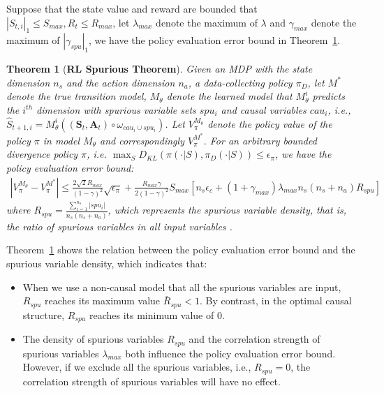 \documentclass{article}
\theoremstyle{plain}
\newtheorem{theorem}{Theorem}[section]
\theoremstyle{definition}
\theoremstyle{remark}
\begin{document}
Suppose that the state value and reward are bounded that $|S_{t,i}|_1\leq S_{max}, R_t\leq R_{max}$, let $\lambda_{max}$ denote the maximum of $\lambda$ and $\gamma_{max}$ denote the maximum of $|\gamma_{spu}|_1$, we have the policy evaluation error bound in Theorem~\ref{theorem-spurious-rl}.
\begin{theorem}[\textbf{RL Spurious Theorem}]
Given an MDP with the state dimension $n_s$ and the action dimension $n_a$, 
a data-collecting policy $\pi_D$,
let $M^*$ denote the true transition model, 
$M_\theta$ denote the learned model that $M_\theta^i$ predicts the $i^{th}$ dimension with spurious variable sets $spu_i$ and causal variables $cau_i$, i.e.,  $\hat{S}_{t+1,i}=M^i_{\theta}((\textbf{S}_t,\textbf{A}_t)\circ \omega_{cau_i\cup spu_i})$.
Let $V_{\pi}^{M_\theta}$ denote the policy value of the policy $\pi$ in model $M_{\theta}$ and correspondingly $V_{\pi}^{M^*}$.
For an arbitrary bounded divergence policy $\pi$, i.e. $\max_{S} D_{KL}(\pi(\cdot|S),\pi_{D}(\cdot|S))\leq \epsilon_{\pi}$, we have the policy evaluation error bound:
\begin{align}
|V_{\pi}^{M_\theta}-V_{\pi}^{M^*}|\leq 
\frac{2\sqrt{2}R_{max}}{(1-\gamma)^2}\sqrt{\epsilon_{\pi}}+ \nonumber
\frac{R_{max}\gamma}{2(1-\gamma)^2}S_{max}[n_s\epsilon_c+\nonumber 
(1+\gamma_{max})\lambda_{max}n_s(n_s+n_a)R_{spu}]
\end{align}
where $R_{spu}=\frac{\sum_{i=1}^{n_s}|spu_i|}{n_s(n_s+n_a)}$, which represents the spurious variable density, that is, the ratio of spurious variables in all input variables .
\label{theorem-spurious-rl}
\end{theorem}
Theorem~\ref{theorem-spurious-rl} shows the relation between the policy evaluation error bound and the spurious variable density, which indicates that:
\begin{itemize}[leftmargin=5mm]
    \item When we use a non-causal model that all the spurious variables are input, $R_{spu}$ reaches its maximum value $\bar{R}_{spu}< 1$. By contrast, in the optimal causal structure, $R_{spu}$ reaches its minimum value of $0$.
    \item The density of spurious variables $R_{spu}$ and the correlation strength of spurious variables $\lambda_{max}$ both influence the policy evaluation error bound.
    However, if we exclude all the spurious variables, i.e., $R_{spu}=0$, the correlation strength of spurious variables will have no effect.
\end{itemize}
\end{document}
